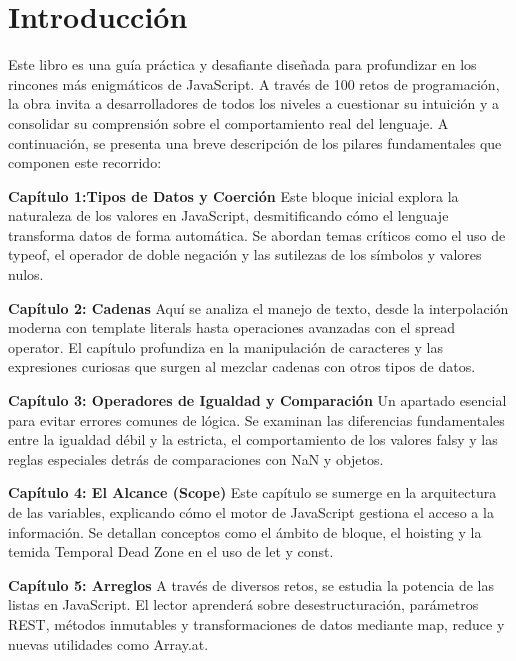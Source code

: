 \documentclass[
  letterpaper,
  DIV=11,
  numbers=noendperiod]{scrreprt}
\begin{document}

\chapter*{Introducción}\label{introducciuxf3n}


Este libro es una guía práctica y desafiante diseñada para profundizar
en los rincones más enigmáticos de JavaScript. A través de 100 retos de
programación, la obra invita a desarrolladores de todos los niveles a
cuestionar su intuición y a consolidar su comprensión sobre el
comportamiento real del lenguaje. A continuación, se presenta una breve
descripción de los pilares fundamentales que componen este recorrido:

\textbf{Capítulo 1:Tipos de Datos y Coerción} Este bloque inicial
explora la naturaleza de los valores en JavaScript, desmitificando cómo
el lenguaje transforma datos de forma automática. Se abordan temas
críticos como el uso de typeof, el operador de doble negación y las
sutilezas de los símbolos y valores nulos.

\textbf{Capítulo 2: Cadenas} Aquí se analiza el manejo de texto, desde
la interpolación moderna con template literals hasta operaciones
avanzadas con el spread operator. El capítulo profundiza en la
manipulación de caracteres y las expresiones curiosas que surgen al
mezclar cadenas con otros tipos de datos.

\textbf{Capítulo 3: Operadores de Igualdad y Comparación} Un apartado
esencial para evitar errores comunes de lógica. Se examinan las
diferencias fundamentales entre la igualdad débil y la estricta, el
comportamiento de los valores falsy y las reglas especiales detrás de
comparaciones con NaN y objetos.

\textbf{Capítulo 4: El Alcance (Scope)} Este capítulo se sumerge en la
arquitectura de las variables, explicando cómo el motor de JavaScript
gestiona el acceso a la información. Se detallan conceptos como el
ámbito de bloque, el hoisting y la temida Temporal Dead Zone en el uso
de let y const.

\textbf{Capítulo 5: Arreglos} A través de diversos retos, se estudia la
potencia de las listas en JavaScript. El lector aprenderá sobre
desestructuración, parámetros REST, métodos inmutables y
transformaciones de datos mediante map, reduce y nuevas utilidades como
Array.at.
\end{document}
